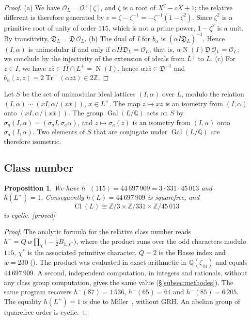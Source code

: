 \documentclass[11pt,a4paper]{amsart}
\theoremstyle{plain}
\newtheorem{proposition}[theorem]{Proposition}
\theoremstyle{definition}
\numberwithin{equation}{section}
\newcommand{\Q}{\mathbb{Q}}
\newcommand{\Z}{\mathbb{Z}}
\newcommand{\OO}{\mathcal{O}}
\newcommand{\Op}{\mathcal{O}^{+}}
\newcommand{\Dif}{\mathfrak{D}}
\DeclareMathOperator{\Tr}{Tr}
\DeclareMathOperator{\Nm}{N}
\DeclareMathOperator{\Cl}{Cl}
\DeclareMathOperator{\Gal}{Gal}
\newcommand{\Trp}{\Tr^{+}}
\newcommand{\st}[1]{\textup{\textsf{\small[#1]}}}
\newcommand{\DEM}{\st{proved}}
\begin{document}
\begin{proof}
(a) We have $\OO_L=\Op[\zeta]$, and $\zeta$ is a root of $X^2-cX+1$; the relative different is therefore generated by $e=\zeta-\zeta^{-1}=-\zeta^{-1}(1-\zeta^2)$. Since $\zeta^2$ is a primitive root of unity of order $115$, which is not a prime power, $1-\zeta^2$ is a unit. By transitivity, $\Dif_L=\Dif\,\OO_L$.
(b) The dual of $I$ for $b_\alpha$ is $(\alpha\bar I\Dif_L)^{-1}$. Hence $(I,\alpha)$ is unimodular if and only if $\alpha I\bar I\Dif_L=\OO_L$, that is, $\alpha\Nm(I)\Dif\,\OO_L=\OO_L$; we conclude by the injectivity of the extension of ideals from $L^+$ to $L$.
(c) For $z\in I$, we have $z\bar z\in I\bar I\cap L^+=\Nm(I)$, hence $\alpha z\bar z\in\Dif^{-1}$ and $b_\alpha(z,z)=2\Trp(\alpha z\bar z)\in2\Z$.
\end{proof}

Let $S$ be the set of unimodular ideal lattices $(I,\alpha)$ over $L$, modulo the relation $(I,\alpha)\sim(xI,\alpha/(x\bar x))$, $x\in L^\times$. The map $z\mapsto xz$ is an isometry from $(I,\alpha)$ onto $(xI,\alpha/(x\bar x))$. The group $\Gal(L/\Q)$ acts on $S$ by $\sigma_a(I,\alpha)=(\sigma_aI,\sigma_a\alpha)$, and $z\mapsto\sigma_a(z)$ is an isometry from $(I,\alpha)$ onto $\sigma_a(I,\alpha)$. Two elements of $S$ that are conjugate under $\Gal(L/\Q)$ are therefore isometric.

\subsection{Class number}

\begin{proposition}\label{prop:hmoins}
We have $h^-(115)=44\,697\,909=3\cdot331\cdot45\,013$ and $h(L^+)=1$. Consequently $h(L)=44\,697\,909$ is squarefree, and
\[
\Cl(L)\cong\Z/3\times\Z/331\times\Z/45\,013
\]
is cyclic. \DEM
\end{proposition}

\begin{proof}
The analytic formula for the relative class number reads $h^-=Q\,w\prod_{\chi}\bigl(-\tfrac12B_{1,\chi^*}\bigr)$, where the product runs over the odd characters modulo $115$, $\chi^*$ is the associated primitive character, $Q=2$ is the Hasse index and $w=230$ (\cite[Thm.~4.17]{Was97}). The product was evaluated in exact arithmetic in $\Q(\zeta_{44})$ and equals $44\,697\,909$. A second, independent computation, in integers and rationals, without any class group computation, gives the same value (\S\ref{subsec:methodes}). The same program recovers $h^-(87)=1\,536$, $h^-(65)=64$ and $h^-(85)=6\,205$. The equality $h(L^+)=1$ is due to Miller~\cite[Thm.~1.1]{Mil14}, without GRH. An abelian group of squarefree order is cyclic.
\end{proof}
\end{document}
